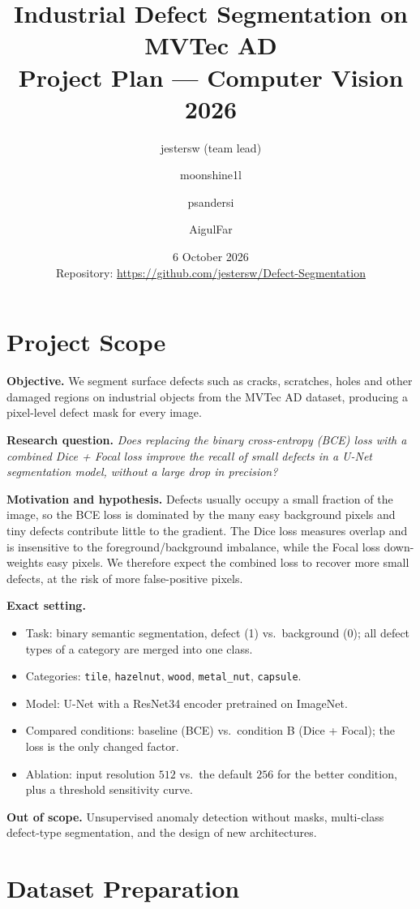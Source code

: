 \documentclass[11pt,a4paper]{article}
\title{\textbf{Industrial Defect Segmentation on MVTec AD}\\[2pt]\large Project Plan --- Computer Vision 2026}
\author{jestersw (team lead) \and moonshine1l \and psandersi \and AigulFar}
\date{6 October 2026\\[2pt]\small Repository: \url{https://github.com/jestersw/Defect-Segmentation}}
\begin{document}
\maketitle

\section{Project Scope}

\textbf{Objective.} We segment surface defects such as cracks, scratches, holes and other damaged regions on industrial objects from the MVTec AD dataset, producing a pixel-level defect mask for every image.

\textbf{Research question.} \emph{Does replacing the binary cross-entropy (BCE) loss with a combined Dice + Focal loss improve the recall of small defects in a U-Net segmentation model, without a large drop in precision?}

\textbf{Motivation and hypothesis.} Defects usually occupy a small fraction of the image, so the BCE loss is dominated by the many easy background pixels and tiny defects contribute little to the gradient. The Dice loss measures overlap and is insensitive to the foreground/background imbalance, while the Focal loss down-weights easy pixels. We therefore expect the combined loss to recover more small defects, at the risk of more false-positive pixels.

\textbf{Exact setting.}
\begin{itemize}
  \item Task: binary semantic segmentation, defect (1) vs.\ background (0); all defect types of a category are merged into one class.
  \item Categories: \texttt{tile}, \texttt{hazelnut}, \texttt{wood}, \texttt{metal\_nut}, \texttt{capsule}.
  \item Model: U-Net with a ResNet34 encoder pretrained on ImageNet.
  \item Compared conditions: baseline (BCE) vs.\ condition B (Dice + Focal); the loss is the only changed factor.
  \item Ablation: input resolution $512$ vs.\ the default $256$ for the better condition, plus a threshold sensitivity curve.
\end{itemize}

\textbf{Out of scope.} Unsupervised anomaly detection without masks, multi-class defect-type segmentation, and the design of new architectures.

\section{Dataset Preparation}
\end{document}
